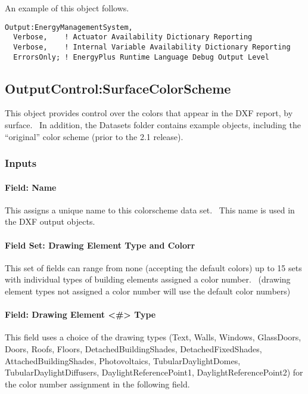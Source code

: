 An example of this object follows.

\begin{lstlisting}
Output:EnergyManagementSystem,
  Verbose,    ! Actuator Availability Dictionary Reporting
  Verbose,    ! Internal Variable Availability Dictionary Reporting
  ErrorsOnly; ! EnergyPlus Runtime Language Debug Output Level
\end{lstlisting}

\subsection{OutputControl:SurfaceColorScheme}\label{outputcontrolsurfacecolorscheme}

This object provides control over the colors that appear in the DXF report, by surface.~ In addition, the Datasets folder contains example objects, including the ``original'' color scheme (prior to the 2.1 release).

\subsubsection{Inputs}\label{inputs-6-021}

\paragraph{Field: Name}\label{field-name-039}

This assigns a unique name to this colorscheme data set.~ This name is used in the DXF output objects.

\paragraph{Field Set: Drawing Element Type and Colorr}\label{field-set-drawing-element-type-and-colorr}

This set of fields can range from none (accepting the default colors) up to 15 sets with individual types of building elements assigned a color number.~ (drawing element types not assigned a color number will use the default color numbers)

\paragraph{Field: Drawing Element \textless{}\#\textgreater{} Type}\label{field-drawing-element-type}

This field uses a choice of the drawing types (Text, Walls, Windows, GlassDoors, Doors, Roofs, Floors, DetachedBuildingShades, DetachedFixedShades, AttachedBuildingShades, Photovoltaics, TubularDaylightDomes, TubularDaylightDiffusers, DaylightReferencePoint1, DaylightReferencePoint2) for the color number assignment in the following field.

